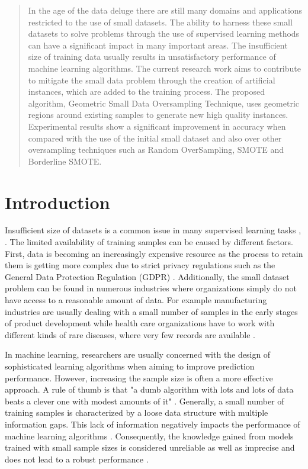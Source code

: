 \begin{abstract}
In the age of the data deluge there are still many domains and applications restricted to the use of small datasets. The ability to harness these small datasets to solve problems through the use of supervised learning methods can have a significant impact in many important areas. The insufficient size of training data usually results in unsatisfactory performance of machine learning algorithms. The current research work aims to contribute to mitigate the small data problem through the creation of artificial instances, which are added to the training process. The proposed algorithm, Geometric Small Data Oversampling Technique, uses geometric regions around existing samples to generate new high quality instances. Experimental results show a significant improvement in accuracy when compared with the use of the initial small dataset and also over other oversampling techniques such as Random OverSampling, SMOTE and Borderline SMOTE.
\end{abstract}

\section{Introduction}
Insufficient size of datasets is a common issue in many supervised learning tasks \cite{Niyogi.1998}, \cite{AbdulLateh.2017}. The limited availability of training samples can be caused by different factors. First, data is becoming an increasingly expensive resource \cite{Li.2007} as the process to retain them is getting more complex due to strict privacy regulations such as the General Data Protection Regulation (GDPR) \cite{EuropeanCommission.2019}. Additionally, the small dataset problem can be found in numerous industries where organizations simply do not have access to a reasonable amount of data. For example manufacturing industries are usually dealing with a small number of samples in the early stages of product development while health care organizations have to work with different kinds of rare diseases, where very few records are available \cite{AbdulLateh.2017}.

In machine learning, researchers are usually concerned with the design of sophisticated learning algorithms when aiming to improve prediction performance. However, increasing the sample size is often a more effective approach. A rule of thumb is that "a dumb algorithm with lots and lots of data beats a clever one with modest amounts of it" \cite{Domingos.2012}. Generally, a small number of training samples is characterized by a loose data structure with multiple information gaps. This lack of information negatively impacts the performance of machine learning algorithms \cite{Lin.2018}. Consequently, the knowledge gained from models trained with small sample sizes is considered unreliable as well as imprecise and does not lead to a robust performance \cite{AbdulLateh.2017}.

